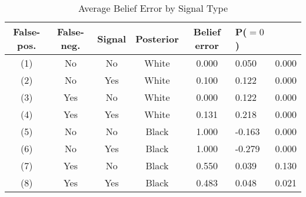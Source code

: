 \begin{table}[H]\centering \caption{Average Belief Error by Signal Type} \begin{tabular}{ccccc} \hline \hline
\textbf{False-pos.}&\textbf{False-neg.}&\textbf{Signal}&\textbf{Posterior}&\textbf{Belief error}& \textbf{P($=0$)}\\ \hline
(1)&No&No&White&0.000&0.050&0.000\\
(2)&No&Yes&White&0.100&0.122&0.000\\
(3)&Yes&No&White&0.000&0.122&0.000\\
(4)&Yes&Yes&White&0.131&0.218&0.000\\
(5)&No&No&Black&1.000&-0.163&0.000\\
(6)&No&Yes&Black&1.000&-0.279&0.000\\
(7)&Yes&No&Black&0.550&0.039&0.130\\
(8)&Yes&Yes&Black&0.483&0.048&0.021\\
\hline \end{tabular} \end{table}
